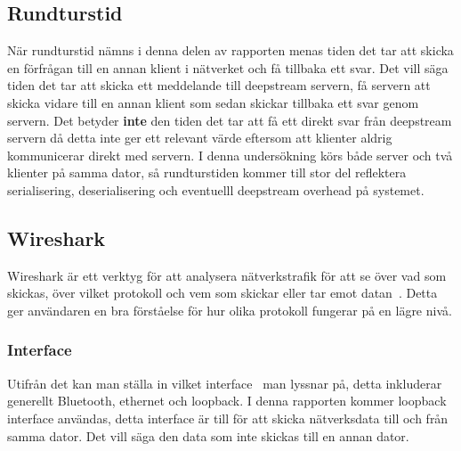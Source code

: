\subsection{Rundturstid}
När rundturstid nämns i denna delen av rapporten menas tiden det tar att skicka en förfrågan till en annan klient i nätverket och få tillbaka ett svar. Det vill säga tiden det tar att skicka ett meddelande till deepstream servern, få servern att skicka vidare till en annan klient som sedan skickar tillbaka ett svar genom servern. Det betyder \textbf{inte} den tiden det tar att få ett direkt svar från deepstream servern då detta inte ger ett relevant värde eftersom att klienter aldrig kommunicerar direkt med servern. I denna undersökning körs både server och två klienter på samma dator, så rundturstiden kommer till stor del reflektera serialisering, deserialisering och eventuelll deepstream overhead på systemet.

\subsection{Wireshark}
Wireshark är ett verktyg för att analysera nätverkstrafik för att se över vad som skickas, över vilket protokoll och vem som skickar eller tar emot datan~\cite{wireshark:main}. Detta ger användaren en bra förståelse för hur olika protokoll fungerar på en lägre nivå.

\subsubsection{Interface}
Utifrån det kan man ställa in vilket interface~\cite[p.~364]{networking} man lyssnar på, detta inkluderar generellt Bluetooth, ethernet och loopback. I denna rapporten kommer loopback interface användas, detta interface är till för att skicka nätverksdata till och från samma dator. Det vill säga den data som inte skickas till en annan dator.
